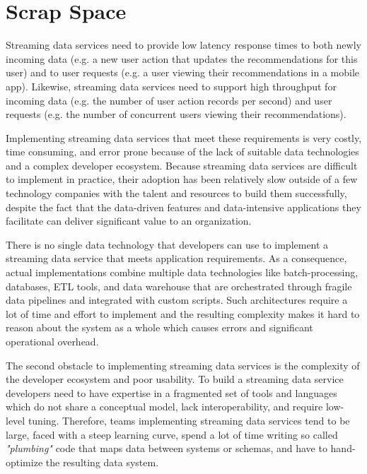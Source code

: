 \documentclass[	DIV=calc,%
							paper=letter,%
							fontsize=11pt,%
							twocolumn]{scrartcl}	 					%
\begin{document}
\section{Scrap Space}


Streaming data services need to provide low latency response times to both newly incoming data (e.g. a new user action that updates the recommendations for this user) and to user requests (e.g. a user viewing their recommendations in a mobile app). Likewise, streaming data services need to support high throughput for incoming data (e.g. the number of user action records per second) and user requests (e.g. the number of concurrent users viewing their recommendations).

Implementing streaming data services that meet these requirements is very costly, time consuming, and error prone because of the lack of suitable data technologies and a complex developer ecosystem. Because streaming data services are difficult to implement in practice, their adoption has been relatively slow outside of a few technology companies with the talent and resources to build them successfully, despite the fact that the data-driven features and data-intensive applications they facilitate can deliver significant value to an organization.

There is no single data technology that developers can use to implement a streaming data service that meets application requirements. As a consequence, actual implementations combine multiple data technologies like batch-processing, databases, ETL tools, and data warehouse that are orchestrated through fragile data pipelines and integrated with custom scripts. Such architectures require a lot of time and effort to implement and the resulting complexity makes it hard to reason about the system as a whole which causes errors and significant operational overhead.


The second obstacle to implementing streaming data services is the complexity of the developer ecosystem and poor usability. To build a streaming data service developers need to have expertise in a fragmented set of tools and languages which do not share a conceptual model, lack interoperability, and require low-level tuning. Therefore, teams implementing streaming data services tend to be large, faced with a steep learning curve, spend a lot of time writing so called \textit{"plumbing"} code that maps data between systems or schemas, and have to hand-optimize the resulting data system.
\end{document}
